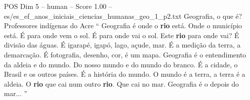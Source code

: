 \begin{textsample}{POS Dim 5 – human – Score 1.00 – es/es\_ef\_anos\_iniciais\_ciencias\_humanas\_geo\_1\_p2.txt}  \label{ex:f5_pos_004}
Geografia, o que é?
Professores indígenas do Acre “ Geografia é onde o \textbf{rio} está.
Onde o município está. É para onde vem o sol. É para onde vai o sol.
Este \textbf{rio} para onde vai? É divisão das águas. É igarapé, igapó, lago, açude, mar. É a medição da terra, a demarcação. É fotografia, desenho, cor, é um mapa.
Geografia é o entendimento da aldeia e do mundo.
Do nosso mundo e do mundo do branco. É a cidade, o Brasil e os outros países. É a história do mundo.
O mundo é a terra, a terra é a aldeia.
O \textbf{rio} que cai num outro \textbf{rio}.
Que cai no mar.
Geografia é o depois do mar... ”

\end{textsample}
